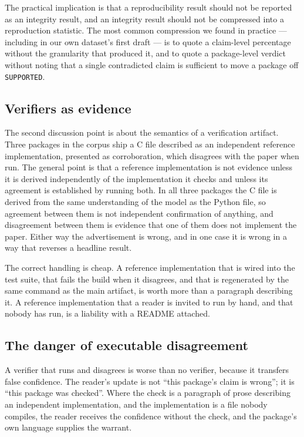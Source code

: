 \documentclass[sigconf,review]{acmart}
\begin{document}
The practical implication is that a reproducibility result should not be
reported as an integrity result, and an integrity result should not be
compressed into a reproduction statistic. The most common compression we found
in practice --- including in our own dataset's first draft --- is to quote a
claim-level percentage without the granularity that produced it, and to quote a
package-level verdict without noting that a single contradicted claim is
sufficient to move a package off \texttt{SUPPORTED}.

\subsection{Verifiers as evidence}
\label{sec:disc-verifiers}

The second discussion point is about the semantics of a verification artifact.
Three packages in the corpus ship a C file described as an independent
reference implementation, presented as corroboration, which disagrees with the
paper when run. The general point is that a reference implementation is not
evidence unless it is derived independently of the implementation it checks
and unless its agreement is established by running both. In all three packages
the C file is derived from the same understanding of the model as the Python
file, so agreement between them is not independent confirmation of anything,
and disagreement between them is evidence that one of them does not implement
the paper. Either way the advertisement is wrong, and in one case it is wrong
in a way that reverses a headline result.

The correct handling is cheap. A reference implementation that is wired into
the test suite, that fails the build when it disagrees, and that is regenerated
by the same command as the main artifact, is worth more than a paragraph
describing it. A reference implementation that a reader is invited to run by
hand, and that nobody has run, is a liability with a README attached.

\subsection{The danger of executable disagreement}
\label{sec:disc-danger}

A verifier that runs and disagrees is worse than no verifier, because it
transfers false confidence. The reader's update is not ``this package's claim
is wrong''; it is ``this package was checked''. Where the check is a
paragraph of prose describing an independent implementation, and the
implementation is a file nobody compiles, the reader receives the confidence
without the check, and the package's own language supplies the warrant.
\end{document}
